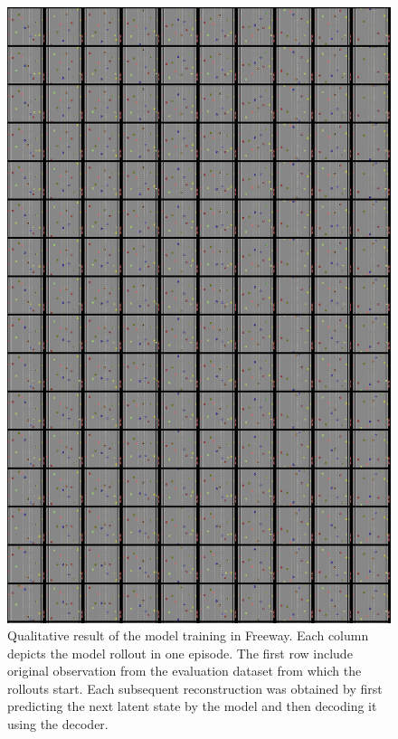 \begin{figure}[H]
\includegraphics[height=0.9\textheight,keepaspectratio]{figures/PlaNet/Freeway_memory_sharp.png}
\caption[Qualitative result of the PlaNet model training with a lower divergence scale in Freeway]{Qualitative result of the model training in Freeway. Each column depicts the model rollout in one episode. The first row include original observation from the evaluation dataset from which the rollouts start. Each subsequent reconstruction was obtained by first predicting the next latent state by the model and then decoding it using the decoder.}
\label{Fig.PlaNet_Freeway_lower_divergence_scale}
\end{figure}

